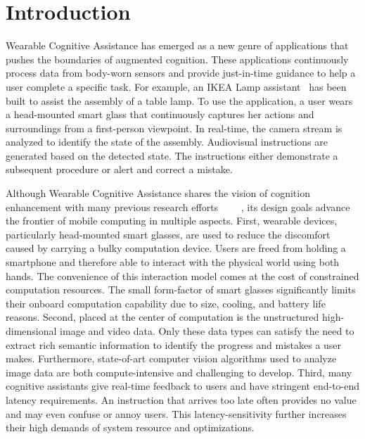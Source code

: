 \chapter{Introduction}

Wearable Cognitive Assistance has emerged as a new genre of applications that
pushes the boundaries of augmented cognition. These applications continuously
process data from body-worn sensors and provide just-in-time guidance to help a
user complete a specific task. For example, an IKEA Lamp
assistant~\cite{chen2018application} has been built to assist the assembly of a
table lamp. To use the application, a user wears a head-mounted smart glass that
continuously captures her actions and surroundings from a first-person
viewpoint. In real-time, the camera stream is analyzed to identify the state of
the assembly. Audiovisual instructions are generated based on the detected
state. The instructions either demonstrate a subsequent procedure or alert and
correct a mistake.

Although Wearable Cognitive Assistance shares the vision of cognition
enhancement with many previous research
efforts~\cite{kidd1999aware}~\cite{loomis1998navigation}
~\cite{cheverst2000developing}~\cite{tanuwidjaja2014chroma},
its design goals advance the frontier of mobile computing in multiple aspects.
First, wearable devices, particularly head-mounted smart glasses, are used to
reduce the discomfort caused by carrying a bulky computation device. Users are
freed from holding a smartphone and therefore able to interact with the physical
world using both hands. The convenience of this interaction model comes at the
cost of constrained computation resources. The small form-factor of smart
glasses significantly limits their onboard computation capability due to size,
cooling, and battery life reasons. Second, placed at the center of computation
is the unstructured high-dimensional image and video data. Only these data types
can satisfy the need to extract rich semantic information to identify the
progress and mistakes a user makes. Furthermore, state-of-art computer vision
algorithms used to analyze image data are both compute-intensive and challenging
to develop. Third, many cognitive assistants give real-time feedback to users
and have stringent end-to-end latency requirements. An instruction that arrives
too late often provides no value and may even confuse or annoy users. This
latency-sensitivity further increases their high demands of system resource and
optimizations.

